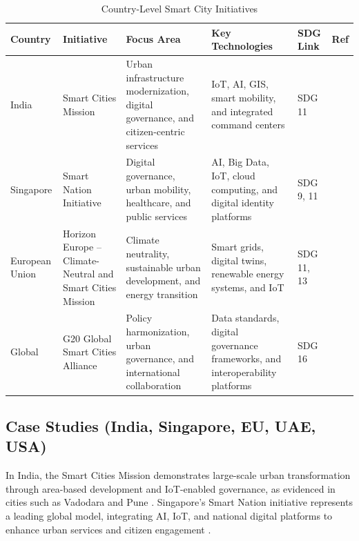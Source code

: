 \documentclass[journal]{IEEEtran}
\begin{document}
\begin{table}[!t]
\caption{Country-Level Smart City Initiatives}
\label{tab:country}
\centering
\scriptsize
\setlength{\tabcolsep}{4pt}
\renewcommand{\arraystretch}{1.15}
\begin{tabularx}{\textwidth}{@{}
>{\raggedright\arraybackslash}p{}
X
>{\raggedright\arraybackslash}p{}
>{\raggedright\arraybackslash}p{}
>{\centering\arraybackslash}p{}
>{\centering\arraybackslash}p{}
@{}}
\toprule
\textbf{Country} &
\textbf{Initiative} &
\textbf{Focus Area} &
\textbf{Key Technologies} &
\textbf{SDG Link} &
\textbf{Ref} \\
\midrule
India &
Smart Cities Mission &
Urban infrastructure modernization, digital governance, and citizen-centric services &
IoT, AI, GIS, smart mobility, and integrated command centers &
SDG 11 &
[120] \\

Singapore &
Smart Nation Initiative &
Digital governance, urban mobility, healthcare, and public services &
AI, Big Data, IoT, cloud computing, and digital identity platforms &
SDG 9, 11 &
[121] \\

European Union &
Horizon Europe – Climate-Neutral and Smart Cities Mission &
Climate neutrality, sustainable urban development, and energy transition &
Smart grids, digital twins, renewable energy systems, and IoT &
SDG 11, 13 &
[122] \\

Global &
G20 Global Smart Cities Alliance &
Policy harmonization, urban governance, and international collaboration &
Data standards, digital governance frameworks, and interoperability platforms &
SDG 16 &
[123] \\
\bottomrule
\end{tabularx}
\end{table}

\subsection{Case Studies (India, Singapore, EU, UAE, USA)}
In India, the Smart Cities Mission demonstrates large-scale urban transformation through area-based development and IoT-enabled governance, as evidenced in cities such as Vadodara and Pune \cite{r122}. Singapore's Smart Nation initiative represents a leading global model, integrating AI, IoT, and national digital platforms to enhance urban services and citizen engagement \cite{r123}.
\end{document}
